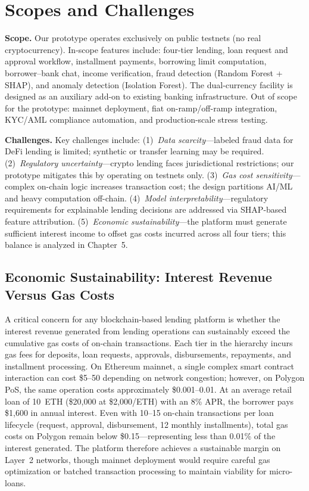 \documentclass[12pt,a4paper]{report}
\begin{document}
\section{Scopes and Challenges}

\textbf{Scope.} Our prototype operates exclusively on public testnets (no real cryptocurrency). In-scope features include: four-tier lending, loan request and approval workflow, installment payments, borrowing limit computation, borrower--bank chat, income verification, fraud detection (Random Forest + SHAP), and anomaly detection (Isolation Forest). The dual-currency facility is designed as an auxiliary add-on to existing banking infrastructure. Out of scope for the prototype: mainnet deployment, fiat on-ramp/off-ramp integration, KYC/AML compliance automation, and production-scale stress testing.

\textbf{Challenges.} Key challenges include: (1)~\textit{Data scarcity}---labeled fraud data for DeFi lending is limited; synthetic or transfer learning may be required. (2)~\textit{Regulatory uncertainty}---crypto lending faces jurisdictional restrictions; our prototype mitigates this by operating on testnets only. (3)~\textit{Gas cost sensitivity}---complex on-chain logic increases transaction cost; the design partitions AI/ML and heavy computation off-chain. (4)~\textit{Model interpretability}---regulatory requirements for explainable lending decisions are addressed via SHAP-based feature attribution. (5)~\textit{Economic sustainability}---the platform must generate sufficient interest income to offset gas costs incurred across all four tiers; this balance is analyzed in Chapter~5.

\subsection{Economic Sustainability: Interest Revenue Versus Gas Costs}

A critical concern for any blockchain-based lending platform is whether the interest revenue generated from lending operations can sustainably exceed the cumulative gas costs of on-chain transactions. Each tier in the hierarchy incurs gas fees for deposits, loan requests, approvals, disbursements, repayments, and installment processing. On Ethereum mainnet, a single complex smart contract interaction can cost \$5--50 depending on network congestion; however, on Polygon PoS, the same operation costs approximately \$0.001--0.01. At an average retail loan of 10~ETH (\$20,000 at \$2,000/ETH) with an 8\% APR, the borrower pays \$1,600 in annual interest. Even with 10--15 on-chain transactions per loan lifecycle (request, approval, disbursement, 12 monthly installments), total gas costs on Polygon remain below \$0.15---representing less than 0.01\% of the interest generated. The platform therefore achieves a sustainable margin on Layer~2 networks, though mainnet deployment would require careful gas optimization or batched transaction processing to maintain viability for micro-loans.
\end{document}
